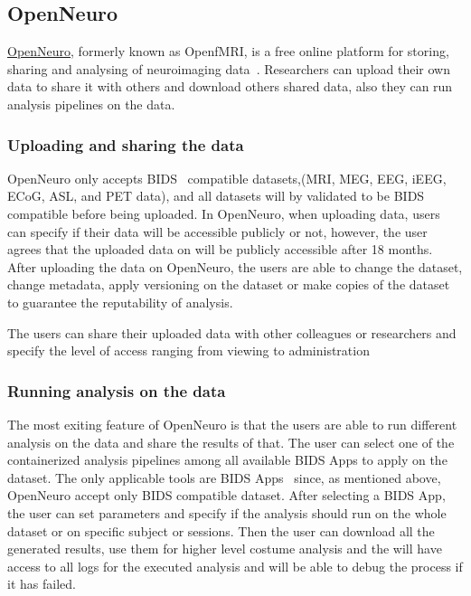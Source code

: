 \subsection{OpenNeuro}
\href{https://openneuro.org}{OpenNeuro}, formerly known as OpenfMRI\cite{poldrack2017openfmri}, is a free online platform for storing, sharing and analysing of neuroimaging data~\cite{gorgolewski2017openneuro}. Researchers can upload their own data to share it with others and download others shared data, also they can run analysis pipelines on the data. 

\subsubsection{Uploading and sharing the data}
 OpenNeuro only accepts BIDS~\cite{gorgolewski2016brain} compatible datasets,(MRI, MEG, EEG, iEEG, ECoG, ASL, and PET data), and all datasets will by validated to be BIDS compatible before being uploaded. In OpenNeuro, when uploading data, users can specify if their data will be accessible publicly or not, however, the user agrees that the uploaded data on will be publicly accessible after 18 months. After uploading the data on OpenNeuro, the users are able to change the dataset, change metadata, apply versioning on the dataset or make copies of the dataset to guarantee the reputability of analysis. 
 
 The users can share their uploaded data with other colleagues or researchers and specify the level of access ranging from viewing to administration 

\subsubsection{Running analysis on the data }
The most exiting feature of OpenNeuro is that the users are able to run different analysis on the data and share the results of that. The user can select one of the containerized analysis pipelines among all available BIDS Apps to apply on the dataset. The only applicable tools are BIDS Apps~\cite{gorgolewski2017bids} since, as mentioned above, OpenNeuro accept only BIDS compatible dataset. After selecting a BIDS App, the user can set parameters and specify if the analysis should run on the whole dataset or on specific subject or sessions. Then the user can download all the generated results, use them for higher level costume analysis and the will have access to all logs for the executed analysis and will be able to debug the process if it has failed.


